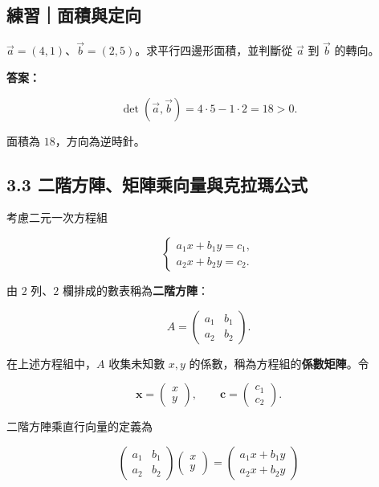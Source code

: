 \documentclass[11pt,a4paper]{article}
\begin{document}
\begin{HandoutSelfCheck}

\subsection{練習｜面積與定向}\label{ux7df4ux7fd2ux9762ux7a4dux8207ux5b9aux5411}

\(\vec a=(4,1)\)、\(\vec b=(2,5)\)。求平行四邊形面積，並判斷從 \(\vec a\) 到 \(\vec b\) 的轉向。

\textbf{答案：}

\[
\det(\vec a,\vec b)=4\cdot5-1\cdot2=18>0.
\]

面積為 \(\boxed{18}\)，方向為逆時針。

\end{HandoutSelfCheck}

\subsection{3.3 二階方陣、矩陣乘向量與克拉瑪公式}\label{ux4e8cux968eux65b9ux9663ux77e9ux9663ux4e58ux5411ux91cfux8207ux514bux62c9ux746aux516cux5f0f}

考慮二元一次方程組

\[
\begin{cases}
a_1x+b_1y=c_1,\\
a_2x+b_2y=c_2.
\end{cases}
\]

由 \(2\) 列、\(2\) 欄排成的數表稱為\textbf{二階方陣}：

\[
A=
\begin{pmatrix}
a_1&b_1\\
a_2&b_2
\end{pmatrix}.
\]

在上述方程組中，\(A\) 收集未知數 \(x,y\) 的係數，稱為方程組的\textbf{係數矩陣}。令

\[
\mathbf{x}=\begin{pmatrix}x\\y\end{pmatrix},
\qquad
\mathbf{c}=\begin{pmatrix}c_1\\c_2\end{pmatrix}.
\]

二階方陣乘直行向量的定義為

\[
\boxed{
\begin{pmatrix}
a_1&b_1\\
a_2&b_2
\end{pmatrix}
\begin{pmatrix}x\\y\end{pmatrix}
=
\begin{pmatrix}
a_1x+b_1y\\
a_2x+b_2y
\end{pmatrix}}
\]
\end{document}
